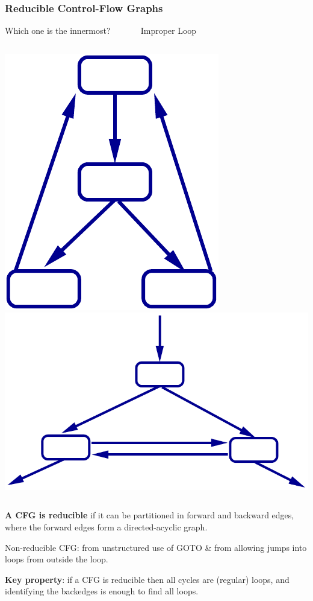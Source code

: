 \documentclass{beamer}
\begin{document}
\begin{frame}[fragile,t]
    \frametitle{Reducible Control-Flow Graphs}

\begin{block}{Which one is the innermost?{\tt~~~~~~~}Improper Loop}
\begin{columns}
\includegraphics[width=17ex]{Figures/LoopAwk}
\includegraphics[width=34ex]{Figures/LoopUnstruct}
\end{columns}
\end{block}

{\bf A CFG is reducible} if it can be partitioned in forward and backward
edges, where the forward edges form a directed-acyclic graph.\smallskip

Non-reducible CFG: from unstructured use of GOTO \& from allowing jumps
into loops from outside the loop.

\bigskip

{\bf Key property}: if a CFG is reducible then all cycles are (regular)
loops, and identifying the backedges is enough to find all loops.

\end{frame}
\end{document}
